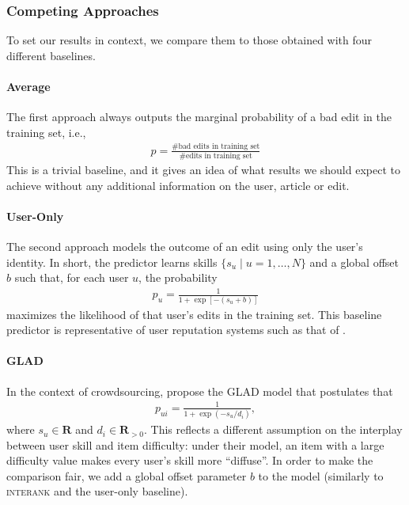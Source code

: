 \subsubsection{Competing Approaches}
\label{sec:wikicompeting}
To set our results in context, we compare them to those obtained with four different baselines.

\paragraph{Average}
The first approach always outputs the marginal probability of a bad edit in the training set, i.e.,
\begin{align*}
	p = \frac{\text{\# bad edits in training set}}{\text{\# edits in training set}}
\end{align*}
This is a trivial baseline, and it gives an idea of what results we should expect to achieve without any additional information on the user, article or edit.

\paragraph{User-Only}
The second approach models the outcome of an edit using only the user's identity.
In short, the predictor learns skills $\{s_u \mid u = 1, \ldots, N\}$ and a global offset $b$ such that, for each user $u$, the probability
\begin{align*}
	p_u = \frac{1}{1 + \exp[- (s_u + b)]}
\end{align*}
maximizes the likelihood of that user's edits in the training set.
This baseline predictor is representative of user reputation systems such as that of \citet{adler2007content}.

\paragraph{GLAD}
In the context of crowdsourcing, \citet{whitehill2009whose} propose the GLAD model that postulates that
\begin{align*}
	p_{ui} = \frac{1}{1 + \exp(- s_u / d_i)},
\end{align*}
where $s_u \in \mathbf{R}$ and $d_i \in \mathbf{R}_{>0}$.
This reflects a different assumption on the interplay between user skill and item difficulty: under their model, an item with a large difficulty value makes every user's skill more ``diffuse''.
In order to make the comparison fair, we add a global offset parameter $b$ to the model (similarly to \textsc{interank} and the user-only baseline).

